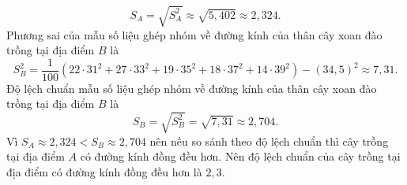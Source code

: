 \begin{ex}
{		$$
		S_A=\sqrt{S_A^2} \approx \sqrt{5{,}402} \approx 2{,}324.
		$$
		Phương sai của mẫu số liệu ghép nhóm về đường kính của thân cây xoan đào trồng tại địa điểm $B$ là
		$$
		S_B^2=\dfrac{1}{100}\left(22 \cdot 31^2+27 \cdot 33^2+19\cdot 35^2+18 \cdot 37^2+14\cdot 39^2\right)-(34{,}5)^2 \approx 7{,}31.
		$$
		Độ lệch chuẩn mẫu số liệu ghép nhóm về đường kính của thân cây xoan đào trồng tại địa điểm $B$ là
		$$
		S_B=\sqrt{S_B^2}=\sqrt{7{,}31} \approx 2{,}704.
		$$
		Vì $S_A\approx 2{,}324< S_B\approx 2{,}704$ nên nếu so sánh theo độ lệch chuẩn thì cây trồng tại địa điểm $A$ có đường kính đồng đều hơn.
		Nên độ lệch chuẩn của cây trồng tại địa điểm có đường kính đồng đều hơn là $2{,}3$.
	}
\end{ex}


